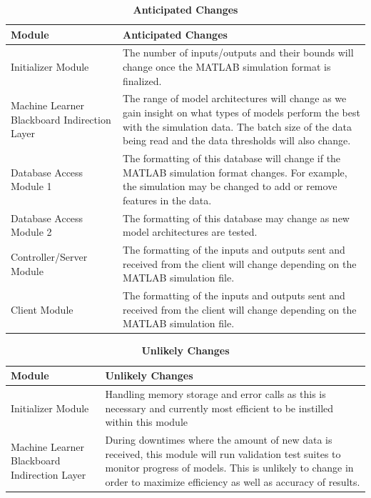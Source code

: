 \documentclass[12pt, titlepage]{article}
\begin{document}
\begin{longtable}{|p{4cm}|p{4cm}|}
  \caption{\bf Anticipated Changes}\\
           \hline
           \bf Module & \bf Anticipated Changes\\
           \hline
           Initializer Module & The number of inputs/outputs and their bounds will change once the MATLAB simulation format is finalized.\\
           \hline
           Machine Learner Blackboard Indirection Layer & The range of model architectures will change as we gain insight on what types of models perform the best with the simulation data. The batch size of the data being read and the data thresholds will also change.\\
           \hline 
           Database Access Module 1 & The formatting of this database will change if the MATLAB simulation format changes. For example, the simulation may be changed to add or remove features in the data.\\
           \hline 
           Database Access Module 2 & The formatting of this database may change as new model architectures are tested.\\
           \hline 
           Controller/Server Module & The formatting of the inputs and outputs sent and received from the client will change depending on the MATLAB simulation file.\\
           \hline 
           Client Module & The formatting of the inputs and outputs sent and received from the client will change depending on the MATLAB simulation file.\\
           \hline 
  \end{longtable}

\begin{longtable}{|p{4cm}|p{4cm}|}
  \caption{\bf Unlikely Changes}\\
           \hline
           \bf Module & \bf Unlikely Changes\\
           \hline
           Initializer Module & Handling memory storage and error calls as this is necessary and currently most efficient to be instilled within this module\\
           \hline
           Machine Learner Blackboard Indirection Layer & During downtimes where the amount of new data is received, this module will run validation test suites to monitor progress of models. This is unlikely to change in order to maximize efficiency as well as accuracy of results.\\
           \hline 
  \end{longtable}
\end{document}
